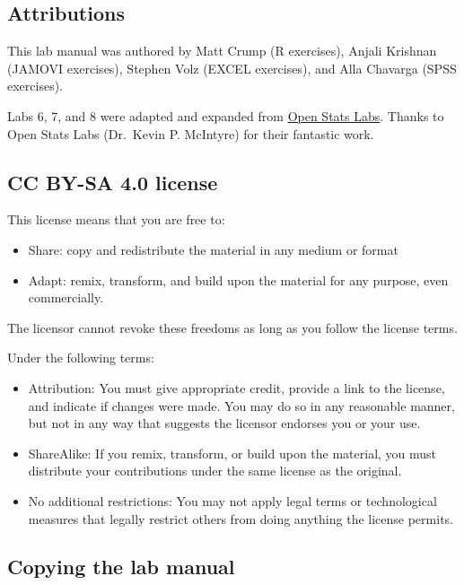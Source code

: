 \documentclass[
]{book}
\providecommand{\tightlist}{%
  \setlength{\itemsep}{0pt}\setlength{\parskip}{0pt}}
\begin{document}
\hypertarget{attributions}{%
\subsection{Attributions}\label{attributions}}

This lab manual was authored by Matt Crump (R exercises), Anjali Krishnan (JAMOVI exercises), Stephen Volz (EXCEL exercises), and Alla Chavarga (SPSS exercises).

Labs 6, 7, and 8 were adapted and expanded from \href{https://sites.trinity.edu/osl}{Open Stats Labs}. Thanks to Open Stats Labs (Dr.~Kevin P. McIntyre) for their fantastic work.

\hypertarget{cc-by-sa-4.0-license}{%
\subsection{CC BY-SA 4.0 license}\label{cc-by-sa-4.0-license}}

This license means that you are free to:

\begin{itemize}
\tightlist
\item
  Share: copy and redistribute the material in any medium or format
\item
  Adapt: remix, transform, and build upon the material for any purpose, even commercially.
\end{itemize}

The licensor cannot revoke these freedoms as long as you follow the license terms.

Under the following terms:

\begin{itemize}
\tightlist
\item
  Attribution: You must give appropriate credit, provide a link to the license, and indicate if changes were made. You may do so in any reasonable manner, but not in any way that suggests the licensor endorses you or your use.
\item
  ShareAlike: If you remix, transform, or build upon the material, you must distribute your contributions under the same license as the original.
\item
  No additional restrictions: You may not apply legal terms or technological measures that legally restrict others from doing anything the license permits.
\end{itemize}

\hypertarget{copying-the-lab-manual}{%
\subsection{Copying the lab manual}\label{copying-the-lab-manual}}
\end{document}
